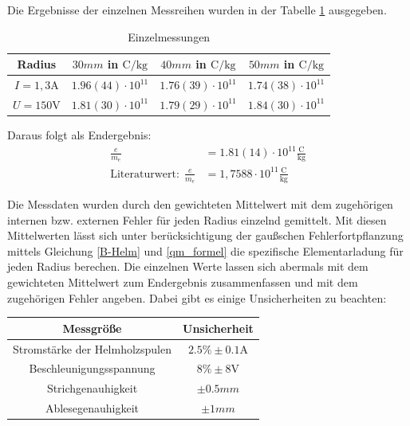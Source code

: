\documentclass[11pt, a4paper]{article}
\begin{document}
        Die Ergebnisse der einzelnen Messreihen wurden in der Tabelle \ref{tab:einzelmessungen} ausgegeben.
        \begin{table}[H]
            \centering

            \begin{tabular}{c | c | c | c}
                Radius &  $30 \si{mm}$ in $\si{\coulomb\per\kilogram}$ & $40 \si{mm}$ in $\si{\coulomb\per\kilogram}$& $50 \si{mm}$ in $\si{\coulomb\per\kilogram}$ \\ \hline
                $I = 1,3 \si{\ampere}$  & $1.96(44) \cdot 10^{11}$ & $1.76(39) \cdot 10^{11}$ &$1.74(38) \cdot 10^{11}$ \\
                $U = 150 \si{\volt}$ & $1.81(30) \cdot 10^{11}$ & $1.79(29) \cdot 10^{11}$ &$1.84(30) \cdot 10^{11}$ \\
            \end{tabular}
            \label{tab:einzelmessungen}
            \caption{Einzelmessungen}
        \end{table}
        
        Daraus folgt als Endergebnis: 
        \begin{align}
            \frac{e}{m_e} &= 1.81(14) \cdot 10^{11} \frac{\si{\coulomb}}{\si{\kilogram}} \label{emend} \\
            \text{Literaturwert:} \ \ \frac{e}{m_e} &= 1,7588 \cdot 10^{11} \frac{\si{\coulomb}}{\si{\kilogram}}
        \end{align}

        Die Messdaten wurden durch den gewichteten Mittelwert \cite[Kapitel 5]{ABW} mit dem zugehörigen internen bzw. externen Fehler für jeden Radius einzelnd gemittelt.
        Mit diesen Mittelwerten lässt sich unter berücksichtigung der gaußschen Fehlerfortpflanzung \cite[(19)]{ABW} mittels Gleichung \ref{B-Helm} und \ref{qm_formel} die spezifische Elementarladung für jeden Radius berechen. Die einzelnen Werte lassen sich abermals mit dem gewichteten Mittelwert zum Endergebnis zusammenfassen und mit dem zugehörigen Fehler angeben.
        Dabei gibt es einige Unsicherheiten zu beachten:
        \begin{table}[H]
            \centering
          

            \begin{tabular}{c | c}
                Messgröße & Unsicherheit \\ \hline
                Stromstärke der Helmholzspulen  & $2.5 \% \pm 0.1 \si{\ampere}$ \cite{vc130} \\
                Beschleunigungsspannung & $ 8\% \pm 8 \si{\volt}$ \cite{vc120}\\
                Strichgenauhigkeit & $\pm 0.5 \si{mm}$ \\
                Ablesegenauhigkeit & $\pm 1 \si{mm}$\\
            \end{tabular}
        \end{table}
        
\end{document}
